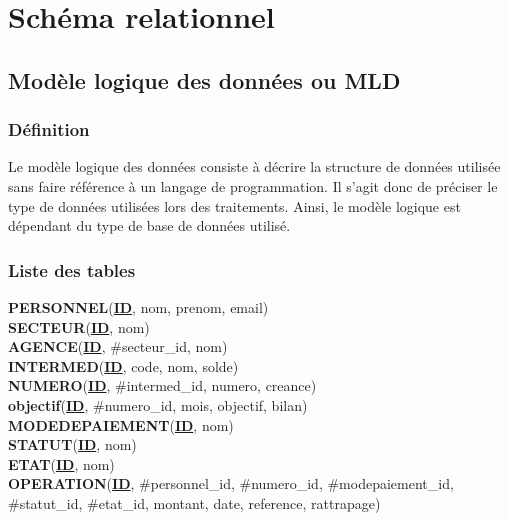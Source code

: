		\section{Schéma relationnel}
			\subsection{Modèle logique des données ou MLD}
				\subsubsection{Définition}
					Le modèle logique des données consiste à décrire la structure de données utilisée sans faire référence à un langage de programmation. Il s'agit donc de préciser le type de données utilisées lors des traitements. Ainsi, le modèle logique est dépendant du type de base de données utilisé.
				\subsubsection{Liste des tables}
					
					\textbf{PERSONNEL}(\underline{\textbf{ID}}, nom, prenom, email)\\
					
					\textbf{SECTEUR}(\underline{\textbf{ID}}, nom)\\
					
					\textbf{AGENCE}(\underline{\textbf{ID}}, \#secteur\_id, nom)\\
					
					\textbf{INTERMED}(\underline{\textbf{ID}}, code, nom, solde)\\
					
					
					\textbf{NUMERO}(\underline{\textbf{ID}}, \#intermed\_id, numero, creance)\\
					
					\textbf{objectif}(\underline{\textbf{ID}}, \#numero\_id, mois, objectif, bilan)\\
					
					\textbf{MODEDEPAIEMENT}(\underline{\textbf{ID}}, nom)\\
					
					\textbf{STATUT}(\underline{\textbf{ID}}, nom)\\
					
					\textbf{ETAT}(\underline{\textbf{ID}}, nom)\\
					
					\textbf{OPERATION}(\underline{\textbf{ID}}, \#personnel\_id, \#numero\_id, \#modepaiement\_id, \#statut\_id, \#etat\_id, montant, date, reference, rattrapage)\\
					

